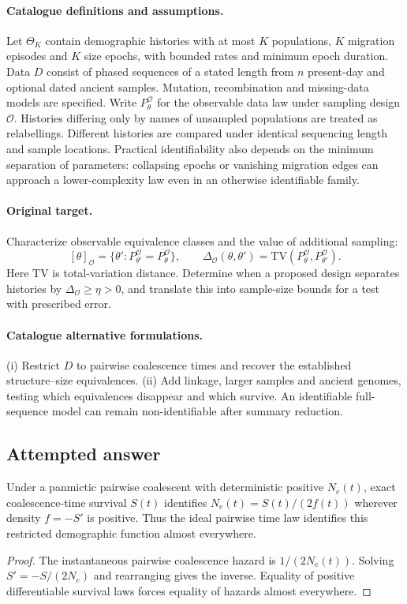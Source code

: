 \documentclass[11pt]{article}
\begin{document}
\paragraph{Catalogue definitions and assumptions.}
Let $\Theta_K$ contain demographic histories with at most $K$ populations, $K$ migration episodes and $K$ size epochs, with bounded rates and minimum epoch duration. Data $D$ consist of phased sequences of a stated length from $n$ present-day and optional dated ancient samples. Mutation, recombination and missing-data models are specified. Write $P_\theta^\mathcal O$ for the observable data law under sampling design $\mathcal O$. Histories differing only by names of unsampled populations are treated as relabellings. Different histories are compared under identical sequencing length and sample locations. Practical identifiability also depends on the minimum separation of parameters: collapsing epochs or vanishing migration edges can approach a lower-complexity law even in an otherwise identifiable family.
\paragraph{Original target.}
Characterize observable equivalence classes and the value of additional sampling:
\[
 [\theta]_{\mathcal O}=\{\theta':P_{\theta'}^\mathcal O=P_\theta^\mathcal O\},
 \qquad
 \Delta_{\mathcal O}(\theta,\theta')=
 \mathrm{TV}(P_\theta^\mathcal O,P_{\theta'}^\mathcal O).
\]
Here $\mathrm{TV}$ is total-variation distance. Determine when a proposed design separates histories by $\Delta_{\mathcal O}\ge\eta>0$, and translate this into sample-size bounds for a test with prescribed error.
\paragraph{Catalogue alternative formulations.}
(i) Restrict $D$ to pairwise coalescence times and recover the established structure--size equivalences. (ii) Add linkage, larger samples and ancient genomes, testing which equivalences disappear and which survive. An identifiable full-sequence model can remain non-identifiable after summary reduction.
\subsection{Attempted answer}
\begin{proposition}
Under a panmictic pairwise coalescent with deterministic positive $N_e(t)$, exact coalescence-time survival $S(t)$ identifies $N_e(t)=S(t)/(2f(t))$ wherever density $f=-S\prime$ is positive. Thus the ideal pairwise time law identifies this restricted demographic function almost everywhere.
\end{proposition}
\begin{proof}
The instantaneous pairwise coalescence hazard is $1/(2N_e(t))$. Solving $S\prime=-S/(2N_e)$ and rearranging gives the inverse. Equality of positive differentiable survival laws forces equality of hazards almost everywhere.
\end{proof}
\end{document}
